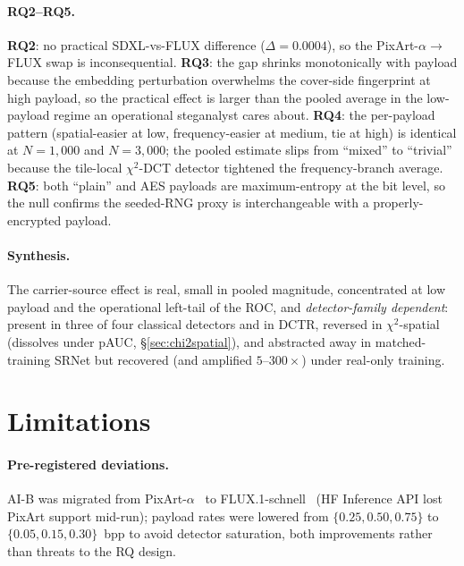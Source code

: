 \documentclass[10pt,twocolumn,a4paper]{article}
\begin{document}
\paragraph{RQ2--RQ5.} \textbf{RQ2}: no practical SDXL-vs-FLUX difference ($\Delta\!=\!0.0004$), so the PixArt-$\alpha\!\to$\,FLUX swap is inconsequential. \textbf{RQ3}: the gap shrinks monotonically with payload because the embedding perturbation overwhelms the cover-side fingerprint at high payload, so the practical effect is larger than the pooled average in the low-payload regime an operational steganalyst cares about. \textbf{RQ4}: the per-payload pattern (spatial-easier at low, frequency-easier at medium, tie at high) is identical at $N\!=\!1{,}000$ and $N\!=\!3{,}000$; the pooled estimate slips from ``mixed'' to ``trivial'' because the tile-local $\chi^2$-DCT detector tightened the frequency-branch average. \textbf{RQ5}: both ``plain'' and AES payloads are maximum-entropy at the bit level, so the null confirms the seeded-RNG proxy is interchangeable with a properly-encrypted payload.

\paragraph{Synthesis.} The carrier-source effect is real, small in pooled magnitude, concentrated at low payload and the operational left-tail of the ROC, and \emph{detector-family dependent}: present in three of four classical detectors and in DCTR, reversed in $\chi^2$-spatial (dissolves under pAUC, \S\ref{sec:chi2spatial}), and abstracted away in matched-training SRNet but recovered (and amplified $5$--$300\times$) under real-only training.

\section{Limitations}
\label{sec:limitations}

\paragraph{Pre-registered deviations.} AI-B was migrated from PixArt-$\alpha$~\cite{pixart2023} to FLUX.1-schnell~\cite{flux2024} (HF Inference API lost PixArt support mid-run); payload rates were lowered from $\{0.25,0.50,0.75\}$ to $\{0.05,0.15,0.30\}$~bpp to avoid detector saturation, both improvements rather than threats to the RQ design.
\end{document}
